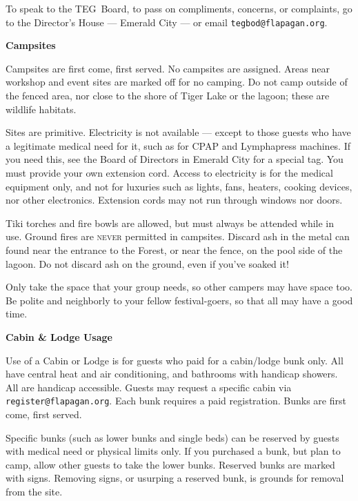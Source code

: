 \documentclass[9pt,twoside,openright,final,article]{memoir}
\def\teg{{\hminfamily TEG\ }}
\renewcommand{\subsection}[1]{%
  \vspace{6pt}%
  \needspace{1.25in}%
  \begin{center}\textbf{\Large \beltanefamily #1}\end{center}

  \nopagebreak}
\begin{document}
\begin{multicols}{2}
  To speak to the \teg Board, to pass on compliments, concerns, or
  complaints, go to the Director's House --- Emerald City --- or email
  \texttt{tegbod@flapagan.org}.

  \subsection{Campsites}

  Campsites are first come, first served. No campsites are assigned. Areas
  near workshop and event sites are marked off for no camping. Do not camp
  outside of the fenced area, nor close to the shore of Tiger Lake or the
  lagoon; these are wildlife habitats.

  Sites are primitive. Electricity is not available --- except to
  those guests who have a legitimate medical need for it, such as for
  CPAP and Lymphapress machines. If you need this, see the Board of
  Directors in Emerald City for a special tag. You must provide your
  own extension cord. Access to electricity is for the medical
  equipment only, and not for luxuries such as lights, fans, heaters,
  cooking devices, nor other electronics. Extension cords may not run
  through windows nor doors.

  Tiki torches and fire bowls are allowed, but must always be attended
  while in use. Ground fires are \textsc{never} permitted in
  campsites. Discard ash in the metal can found near the entrance to
  the Forest, or near the fence, on the pool side of the lagoon. Do
  not discard ash on the ground, even if you've soaked it!

  Only take the space that your group needs, so other campers may have
  space too. Be polite and neighborly to your fellow festival-goers,
  so that all may have a good time.

  \subsection{Cabin \& Lodge Usage}

  Use of a Cabin or Lodge is for guests who paid for a cabin/lodge
  bunk only. All have central heat and air conditioning, and bathrooms
  with handicap showers. All are handicap accessible. Guests may
  request a specific cabin via \texttt{register@flapagan.org}. Each
  bunk requires a paid registration. Bunks are first come, first
  served.

  Specific bunks (such as lower bunks and single beds) can be reserved
  by guests with medical need or physical limits only. If you
  purchased a bunk, but plan to camp, allow other guests to take the
  lower bunks. Reserved bunks are marked with signs. Removing signs,
  or usurping a reserved bunk, is grounds for removal from the site.


\end{multicols}
\end{document}
